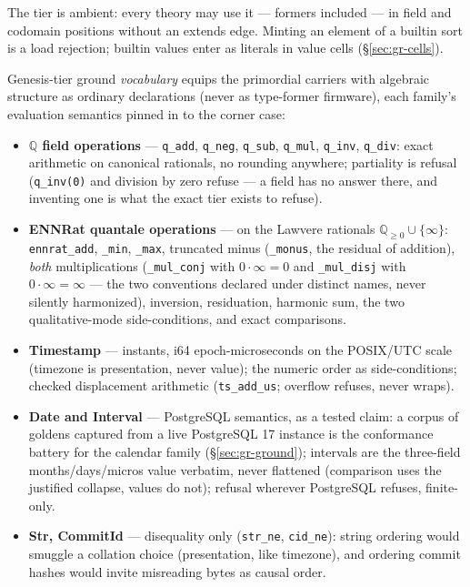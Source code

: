 The tier is ambient: every theory may use it — formers
included — in field and codomain positions without an extends edge.
Minting an element of a builtin sort is a load rejection; builtin
values enter as literals in value cells (\S\ref{sec:gr-cells}).

Genesis-tier ground \emph{vocabulary} equips the primordial carriers
with algebraic structure as ordinary declarations (never as
type-former firmware), each family's evaluation semantics pinned in
 to the corner case:

\begin{itemize}
\item \textbf{$\mathbb{Q}$ field operations} — \texttt{q\_add}, \texttt{q\_neg},
\texttt{q\_sub}, \texttt{q\_mul}, \texttt{q\_inv}, \texttt{q\_div}:
exact arithmetic on canonical rationals, no rounding anywhere;
partiality is refusal (\texttt{q\_inv(0)} and division by zero refuse
— a field has no answer there, and inventing one is what the exact
tier exists to refuse).
\item \textbf{ENNRat quantale operations} — on the Lawvere rationals
$\mathbb{Q}_{\geq 0} \cup \{\infty\}$: \texttt{ennrat\_add},
\texttt{\_min}, \texttt{\_max}, truncated minus (\texttt{\_monus},
the residual of addition), \emph{both} multiplications
(\texttt{\_mul\_conj} with $0 \cdot \infty = 0$ and
\texttt{\_mul\_disj} with $0 \cdot \infty = \infty$ — the two
conventions declared under distinct names, never silently
harmonized), inversion, residuation, harmonic sum, the two
qualitative-mode side-conditions, and exact comparisons.
\item \textbf{Timestamp} — instants, i64 epoch-microseconds on the
POSIX/UTC scale (timezone is presentation, never value); the numeric
order as side-conditions; checked displacement arithmetic
(\texttt{ts\_add\_us}; overflow refuses, never wraps).
\item \textbf{Date and Interval} — PostgreSQL semantics, as a tested
claim: a corpus of goldens captured from a live PostgreSQL 17
instance is the conformance battery for the calendar family
(\S\ref{sec:gr-ground}); intervals are the three-field
months/days/micros value verbatim, never flattened (comparison uses
the justified collapse, values do not); refusal wherever PostgreSQL
refuses, finite-only.
\item \textbf{Str, CommitId} — disequality only
(\texttt{str\_ne}, \texttt{cid\_ne}): string ordering would smuggle a
collation choice (presentation, like timezone), and ordering commit
hashes would invite misreading bytes as causal order.
\end{itemize}

